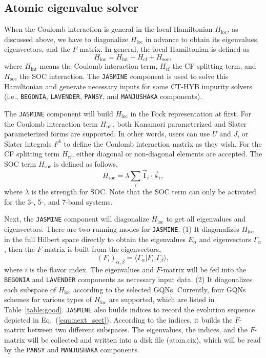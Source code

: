 \subsection{Atomic eigenvalue solver\label{subsec:jasmine}}
When the Coulomb interaction is general in the local Hamiltonian $H_{\text{loc}}$, as discussed above, we have to diagonalize $H_{\text{loc}}$ in advance to obtain its eigenvalues, eigenvectors, and the $F$-matrix. In general, the local Hamiltonian is defined as
\begin{equation}
H_{\text{loc}} = H_{\text{int}} + H_{\text{cf}} + H_{\text{soc}},
\end{equation}
where $H_{\text{int}}$ means the Coulomb interaction term, $H_{\text{cf}}$ the CF splitting term, and $H_{\text{soc}}$ the SOC interaction. The \texttt{JASMINE} component is used to solve this Hamiltonian and generate necessary inputs for some CT-HYB impurity solvers (i.e., \texttt{BEGONIA}, \texttt{LAVENDER}, \texttt{PANSY}, and \texttt{MANJUSHAKA} components).

The \texttt{JASMINE} component will build $H_{\text{loc}}$ in the Fock representation at first. For the Coulomb interaction term $H_{\text{int}}$, both Kanamori parameterized and Slater parameterized forms are supported. In other words, users can use $U$ and $J$, or Slater integrals $F^{k}$ to define the Coulomb interaction matrix as they wish. For the CF splitting term $H_{\text{cf}}$, either diagonal or non-diagonal elements are accepted. The SOC term $H_{\text{soc}}$ is defined as follows,
\begin{equation}
H_{\text{soc}} = \lambda \sum_i \vec{\mathbf{l}}_i \cdot \vec{\mathbf{s}}_i,
\end{equation}
where $\lambda$ is the strength for SOC. Note that the SOC term can only be activated for the 3-, 5-, and 7-band systems.

Next, the \texttt{JASMINE} component will diagonalize $H_{\text{loc}}$ to get all eigenvalues and eigenvectors. There are two running modes for \texttt{JASMINE}. (1) It diagonalizes $H_{\text{loc}}$ in the full Hilbert space directly to obtain the eigenvalues $E_{\alpha}$ and eigenvectors $\Gamma_{\alpha}$, then the $F$-matrix is built from the eigenvectors,
\begin{equation}
(F_{i})_{\alpha,\beta} = \langle\Gamma_{\alpha}|F_{i}|\Gamma_{\beta}\rangle,
\end{equation}
where $i$ is the flavor index. The eigenvalues and $F$-matrix will be fed into the \texttt{BEGONIA} and \texttt{LAVENDER} components as necessary input data. (2) It diagonalizes each subspace of $H_{\text{loc}}$ according to the selected GQNs. Currently, four GQNs schemes for various types of $H_{\text{loc}}$ are supported, which are listed in Table~\ref{table:good}. \texttt{JASMINE} also builds indices to record the evolution sequence depicted in Eq.~(\ref{equ:next_sect}). According to the indices, it builds the $F$-matrix between two different subspaces. The eigenvalues, the indices, and the $F$-matrix will be collected and written into a disk file (atom.cix), which will be read by the \texttt{PANSY} and \texttt{MANJUSHAKA} components.

